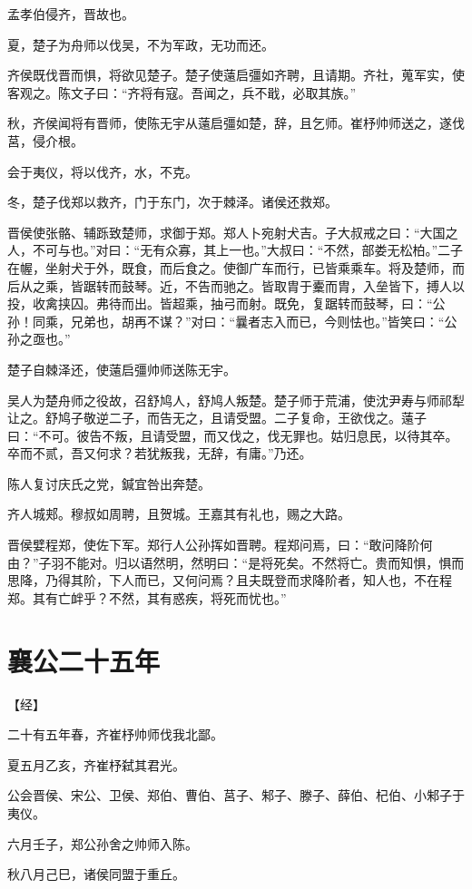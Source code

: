 \documentclass[a4paper,12pt,UTF8,twoside]{ctexbook}
\begin{document}
孟孝伯侵齐，晋故也。

夏，楚子为舟师以伐吴，不为军政，无功而还。

齐侯既伐晋而惧，将欲见楚子。楚子使薳启彊如齐聘，且请期。齐社，蒐军实，使客观之。陈文子曰：“齐将有寇。吾闻之，兵不戢，必取其族。”

秋，齐侯闻将有晋师，使陈无宇从薳启彊如楚，辞，且乞师。崔杼帅师送之，遂伐莒，侵介根。

会于夷仪，将以伐齐，水，不克。

冬，楚子伐郑以救齐，门于东门，次于棘泽。诸侯还救郑。

晋侯使张骼、辅跞致楚师，求御于郑。郑人卜宛射犬吉。子大叔戒之曰：“大国之人，不可与也。”对曰：“无有众寡，其上一也。”大叔曰：“不然，部娄无松柏。”二子在幄，坐射犬于外，既食，而后食之。使御广车而行，已皆乘乘车。将及楚师，而后从之乘，皆踞转而鼓琴。近，不告而驰之。皆取胄于櫜而胄，入垒皆下，搏人以投，收禽挟囚。弗待而出。皆超乘，抽弓而射。既免，复踞转而鼓琴，曰：“公孙！同乘，兄弟也，胡再不谋？”对曰：“曩者志入而已，今则怯也。”皆笑曰：“公孙之亟也。”

楚子自棘泽还，使薳启彊帅师送陈无宇。

吴人为楚舟师之役故，召舒鸠人，舒鸠人叛楚。楚子师于荒浦，使沈尹寿与师祁犁让之。舒鸠子敬逆二子，而告无之，且请受盟。二子复命，王欲伐之。薳子曰：“不可。彼告不叛，且请受盟，而又伐之，伐无罪也。姑归息民，以待其卒。卒而不贰，吾又何求？若犹叛我，无辞，有庸。”乃还。

陈人复讨庆氏之党，鍼宜咎出奔楚。

齐人城郏。穆叔如周聘，且贺城。王嘉其有礼也，赐之大路。

晋侯嬖程郑，使佐下军。郑行人公孙挥如晋聘。程郑问焉，曰：“敢问降阶何由？”子羽不能对。归以语然明，然明曰：“是将死矣。不然将亡。贵而知惧，惧而思降，乃得其阶，下人而已，又何问焉？且夫既登而求降阶者，知人也，不在程郑。其有亡衅乎？不然，其有惑疾，将死而忧也。”

\section{襄公二十五年}



【经】

二十有五年春，齐崔杼帅师伐我北鄙。

夏五月乙亥，齐崔杼弑其君光。

公会晋侯、宋公、卫侯、郑伯、曹伯、莒子、邾子、滕子、薛伯、杞伯、小邾子于夷仪。

六月壬子，郑公孙舍之帅师入陈。

秋八月己巳，诸侯同盟于重丘。
\end{document}
